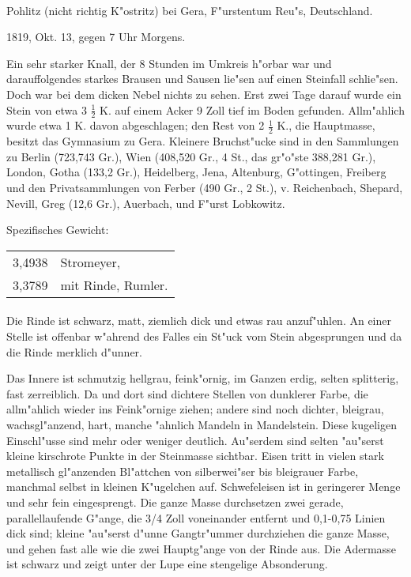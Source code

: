 \documentclass[a4paper, 11pt, oneside]{article}
\begin{document}
\paragraph{}
Pohlitz (nicht richtig K"ostritz) bei Gera, F"urstentum Reu"s, Deutschland.

1819, Okt. 13, gegen 7 Uhr Morgens.

Ein sehr starker Knall, der 8 Stunden im Umkreis h"orbar war und darauffolgendes starkes Brausen und Sausen lie"sen auf einen Steinfall schlie"sen. Doch war bei dem dicken Nebel nichts zu sehen. Erst zwei Tage darauf wurde ein Stein von etwa 3 $\frac{1}{2}$ K. auf einem Acker 9 Zoll tief im Boden gefunden. Allm"ahlich wurde etwa 1 K. davon abgeschlagen; den Rest von 2 $\frac{1}{2}$ K., die Hauptmasse, besitzt das Gymnasium zu Gera. Kleinere Bruchst"ucke sind in den Sammlungen zu Berlin (723,743 Gr.), Wien (408,520 Gr., 4 St., das gr"o"ste 388,281 Gr.), London, Gotha (133,2 Gr.), Heidelberg, Jena, Altenburg, G"ottingen, Freiberg und den Privatsammlungen von Ferber (490 Gr., 2 St.), v. Reichenbach, Shepard, Nevill, Greg (12,6 Gr.), Auerbach, und F"urst Lobkowitz.

Spezifisches Gewicht:
\begin{table}[!ht]
    \centering
    \begin{tabular}{l l}
        3,4938 & Stromeyer,\\
        3,3789 & mit Rinde, Rumler.
    \end{tabular}
\end{table}
\paragraph{}
Die Rinde ist schwarz, matt, ziemlich dick und etwas rau anzuf"uhlen. An einer Stelle ist offenbar w"ahrend des Falles ein St"uck vom Stein abgesprungen und da die Rinde merklich d"unner.

Das Innere ist schmutzig hellgrau, feink"ornig, im Ganzen erdig, selten splitterig, fast zerreiblich. Da und dort sind dichtere Stellen von dunklerer Farbe, die allm"ahlich wieder ins Feink"ornige ziehen; andere sind noch dichter, bleigrau, wachsgl"anzend, hart, manche "ahnlich Mandeln in Mandelstein. Diese kugeligen Einschl"usse sind mehr oder weniger deutlich. Au"serdem sind selten "au"serst kleine kirschrote Punkte in der Steinmasse sichtbar. Eisen tritt in vielen stark metallisch gl"anzenden Bl"attchen von silberwei"ser bis bleigrauer Farbe, manchmal selbst in kleinen K"ugelchen auf. Schwefeleisen ist in geringerer Menge und sehr fein eingesprengt. Die ganze Masse durchsetzen zwei gerade, parallellaufende G"ange, die 3/4 Zoll voneinander entfernt und 0,1-0,75 Linien dick sind; kleine "au"serst d"unne Gangtr"ummer durchziehen die ganze Masse, und gehen fast alle wie die zwei Hauptg"ange von der Rinde aus. Die Adermasse ist schwarz und zeigt unter der Lupe eine stengelige Absonderung.
\end{document}
